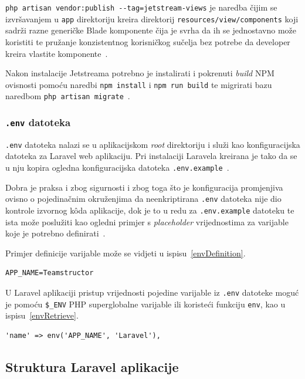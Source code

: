\texttt{php artisan vendor:publish -{}-tag=jetstream-views} je naredba čijim se izvršavanjem u \texttt{app} direktoriju kreira direktorij \texttt{resources/view/components} koji sadrži razne generičke Blade komponente čija je svrha da ih se jednostavno može koristiti te pružanje konzistentnog korisničkog sučelja bez potrebe da developer kreira vlastite komponente~\cite{jetstreamLivewire}.

Nakon instalacije Jetstreama potrebno je instalirati i pokrenuti \textit{build} NPM ovisnosti pomoću naredbi \texttt{npm install} i \texttt{npm run build} te migrirati bazu naredbom \texttt{php artisan migrate}~\cite{jetstreamInstallation}.

\subsubsection{\texttt{.env} datoteka}
\texttt{.env} datoteka nalazi se u aplikacijskom \textit{root} direktoriju i služi kao konfiguracijska datoteka za Laravel web aplikaciju. Pri instalaciji Laravela kreirana je tako da se u nju kopira ogledna konfiguracijska datoteka \texttt{.env.example}~\cite{configuration}. 

Dobra je praksa i zbog sigurnosti i zbog toga što je konfiguracija promjenjiva ovisno o pojedinačnim okruženjima da neenkriptirana \texttt{.env} datoteka nije dio kontrole izvornog k\^oda aplikacije, dok je to u redu za \texttt{.env.example} datoteku te ista može poslužiti kao ogledni primjer s \textit{placeholder} vrijednostima za varijable koje je potrebno definirati~\cite{configuration}.

Primjer definicije varijable može se vidjeti u ispisu~\ref{envDefinition}.

\begin{lstlisting}[caption={Definicija varijable u \texttt{.env} datoteci}, label=envDefinition]
APP_NAME=Teamstructor
\end{lstlisting}

U Laravel aplikaciji pristup vrijednosti pojedine varijable iz \texttt{.env} datoteke moguć je pomoću \texttt{\$\_ENV} PHP superglobalne varijable ili koristeći funkciju \texttt{env}, kao u ispisu~\ref{envRetrieve}.

\begin{lstlisting}[caption={Pristup vrijednosti \textit{environment} varijable u Laravelu}, label=envRetrieve]
'name' => env('APP_NAME', 'Laravel'),
\end{lstlisting}

\subsection{Struktura Laravel aplikacije}

